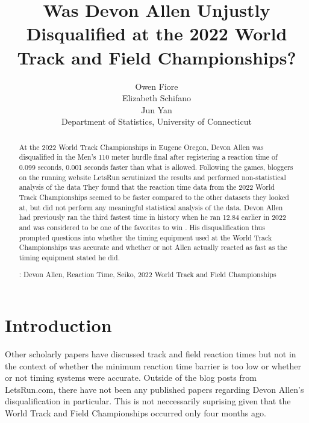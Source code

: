 \documentclass[12pt, letterpaper, titlepage]{article}
\title{Was Devon Allen Unjustly Disqualified at the 2022 World Track and Field Championships?}
\author{Owen Fiore\\
  Elizabeth Schifano\\
  Jun Yan\\[1ex]
  Department of Statistics, University of Connecticut\\
}
\date{}
\begin{document}
\maketitle

\doublespace

\begin{abstract}
  At the 2022 World Track Championships in Eugene Oregon, Devon Allen was disqualified in the
  Men's 110 meter hurdle final after registering a reaction time of 0.099 seconds, 0.001 
  seconds faster than what is allowed.  Following the games, bloggers on the running website 
  LetsRun scrutinized the results and performed non-statistical analysis of the data \citep{Johnson}
  They found that the reaction time data from the 2022 World Track Championships seemed to be faster 
  compared to the other datasets they looked at, but did not perform any meaningful statistical 
  analysis of the data.  Devon Allen had previously ran the third fastest time in history when 
  he ran 12.84 earlier in 2022 and was considered to be one of the favorites to win \citep{Preview}.  His 
  disqualification thus prompted questions into whether the timing equipment used at the World
  Track Championships was accurate and whether or not Allen actually reacted as fast as the 
  timing equipment stated he did.

\noindent{}:
Devon Allen, Reaction Time, Seiko, 2022 World Track and Field Championships 

\end{abstract}



\section{Introduction}
\label{sec:intro}

Other scholarly papers have discussed track and field reaction times but not in the
context of whether the minimum reaction time barrier is too low or whether or not timing
systems were accurate.  Outside of the blog posts from LetsRun.com, there have not been
any published papers regarding Devon Allen's disqualification in particular.  This is not
neccessarily suprising given that the World Track and Field Championships occurred only 
four months ago.
\end{document}
